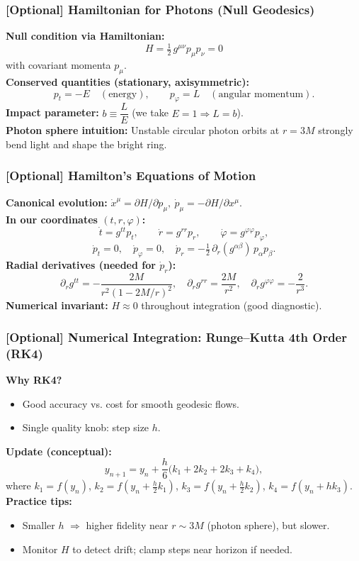 \documentclass[aspectratio=169]{beamer}
\newcommand{\ProgressStep}[1]{\progressstep{#1}}
\newcommand{\ThisFrameTitle}[1]{\frametitle{#1}}
\begin{document}
\begin{frame}
  \ProgressStep{-1}\ThisFrameTitle{[Optional] Hamiltonian for Photons (Null Geodesics)}
  \textbf{Null condition via Hamiltonian:}
  \[
    H=\tfrac12\,g^{\mu\nu}p_\mu p_\nu = 0
  \]
  with covariant momenta \(p_\mu\).\\[0.4em]
  \textbf{Conserved quantities (stationary, axisymmetric):}
  \[
    p_t = -E \quad (\text{energy}),\qquad
    p_\varphi = L \quad (\text{angular momentum}).
  \]
  \textbf{Impact parameter:} \(b \equiv \dfrac{L}{E}\) (we take \(E=1\Rightarrow L=b\)).\\[0.4em]
  \textbf{Photon sphere intuition:} Unstable circular photon orbits at \(r=3M\) strongly bend light and shape the bright ring.
\end{frame}

\begin{frame}
  \ProgressStep{-1}\ThisFrameTitle{[Optional] Hamilton's Equations of Motion}
  \textbf{Canonical evolution:} \(\dot{x}^\mu=\partial H/\partial p_\mu,\ \dot{p}_\mu=-\partial H/\partial x^\mu\).\\[0.4em]
  \textbf{In our coordinates \((t,r,\varphi)\):}
  \[
    \dot{t}=g^{tt}p_t,\qquad
    \dot{r}=g^{rr}p_r,\qquad
    \dot{\varphi}=g^{\varphi\varphi}p_\varphi,
  \]
  \[
    \dot{p}_t=0,\quad \dot{p}_\varphi=0,\quad
    \dot{p}_r=-\tfrac12\,\partial_r(g^{\alpha\beta})\,p_\alpha p_\beta.
  \]
  \textbf{Radial derivatives (needed for \(\dot{p}_r\)):}
  \[
    \partial_r g^{tt}=-\frac{2M}{r^2(1-2M/r)^2},\quad
    \partial_r g^{rr}=\frac{2M}{r^2},\quad
    \partial_r g^{\varphi\varphi}=-\frac{2}{r^3}.
  \]
  \textbf{Numerical invariant:} \(H\approx 0\) throughout integration (good diagnostic).
\end{frame}

\begin{frame}
  \ProgressStep{-1}\ThisFrameTitle{[Optional] Numerical Integration: Runge--Kutta 4th Order (RK4)}
  \textbf{Why RK4?}
  \begin{itemize}
    \item Good accuracy vs. cost for smooth geodesic flows.
    \item Single quality knob: step size \(h\).
  \end{itemize}
  \textbf{Update (conceptual):}
  \[
    y_{n+1}=y_n+\frac{h}{6}\big(k_1+2k_2+2k_3+k_4\big),
  \]
  where \(k_1=f(y_n)\), \(k_2=f(y_n+\tfrac{h}{2}k_1)\), \(k_3=f(y_n+\tfrac{h}{2}k_2)\), \(k_4=f(y_n+hk_3)\).\\[0.4em]
  \textbf{Practice tips:}
  \begin{itemize}
    \item Smaller \(h\) \(\Rightarrow\) higher fidelity near \(r\sim 3M\) (photon sphere), but slower.
    \item Monitor \(H\) to detect drift; clamp steps near horizon if needed.
  \end{itemize}
\end{frame}
\end{document}
